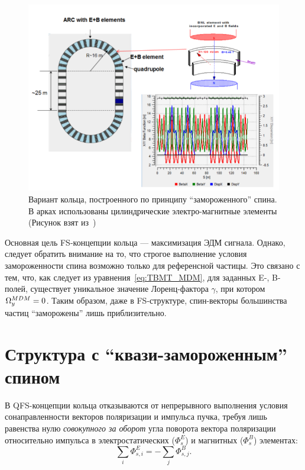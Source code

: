\begin{figure}[h!]
	\centering
	\includegraphics[width=\linewidth]{images/chapter2/BNL_lattice}
	\caption{Вариант кольца, построенного по принципу ``замороженного'' спина. В арках использованы цилиндрические электро-магнитные элементы (Рисунок взят из~\cite{Senichev:Lattices})\label{fig:BNL_lattice}}
\end{figure}

Основная цель FS-концепции кольца --- максимизация ЭДМ сигнала. Однако, следует обратить внимание на то, что строгое выполнение условия замороженности спина возможно только для референсной частицы. Это связано с тем, что, как следует из уравнения~\eqref{eq:TBMT_MDM}, для заданных E-, B-полей, существует уникальное значение Лоренц-фактора $\gamma$, при котором $\Omega_y^{MDM} = 0$. Таким образом, даже в FS-структуре, спин-векторы большинства частиц ``заморожены'' лишь приблизительно.

\section{Структура с ``квази-замороженным'' спином} \label{sec:QFS_concept}
В QFS-концепции кольца отказываются от непрерывного выполнения условия сонаправленности векторов поляризации и импульса пучка, требуя лишь равенства нулю \emph{совокупного за оборот} угла поворота вектора поляризации относительно импульса в электростатических ($\Phi_s^E$) и магнитных ($\Phi_s^B$) элементах:~\cite{Senichev:Lattices}
\begin{equation*}
	\sum_i \Phi_{s,i}^E = -\sum_j \Phi_{s,j}^B.
\end{equation*}

